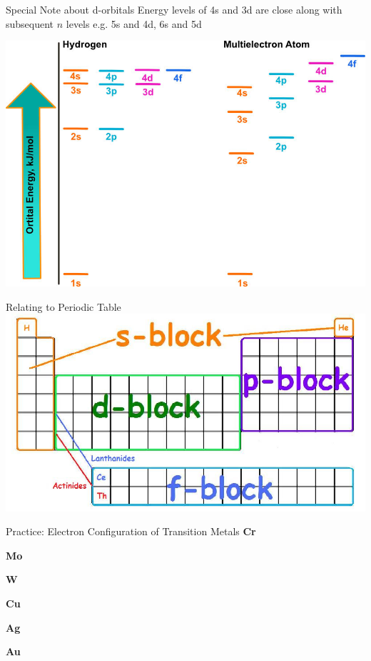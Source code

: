 \documentclass[11pt]{beamer}
\begin{document}
\begin{frame}{Special Note about d-orbitals}
  Energy levels of 4s and 3d are close along with subsequent $n$ levels
  e.g. 5s and 4d, 6s and 5d
  
  \centering
  \includegraphics[scale=1.3]{orbital_energy}
\end{frame}

\begin{frame}{Relating to Periodic Table}
  \centering
  \includegraphics[width=\linewidth]{spdf_orbitals}
\end{frame}

\begin{frame}{Practice: Electron Configuration of Transition Metals}
  \textbf{Cr}
  \vspace{0.25in}
  
  \textbf{Mo}
  \vspace{0.25in}
  
  \textbf{W}
  \vspace{0.25in}

  \textbf{Cu}
  \vspace{0.25in}

  \textbf{Ag}
  \vspace{0.25in}

  \textbf{Au}
  \vspace{0.25in}
\end{frame}
\end{document}
